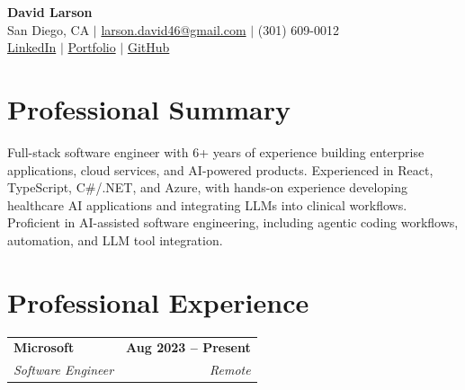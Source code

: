 \documentclass[letterpaper,10pt]{article}
\newcommand{\resumeSubheading}[4]{
    \begin{tabularx}{\textwidth}{X r}
        \textbf{#1} & \textbf{#2} \\
        \textit{\color{muted}#3} & \textit{\color{muted}#4}
    \end{tabularx}
    \vspace{-3pt}
}
\begin{document}
\begin{center}
    {\LARGE \textbf{David Larson}} \\[4pt]
    San Diego, CA \quad $|$ \quad
    \href{mailto:larson.david46@gmail.com}{larson.david46@gmail.com} \quad $|$ \quad
    (301) 609-0012 \\[2pt]
    \href{https://www.linkedin.com/in/larsondavid46}{LinkedIn} \quad $|$ \quad
    \href{https://white-glacier-06b7d7f1e.1.azurestaticapps.net/}{Portfolio} \quad $|$ \quad
    \href{https://github.com/dalarson}{GitHub}
\end{center}

\vspace{-7pt}

\section{Professional Summary}

Full-stack software engineer with 6+ years of experience building
enterprise applications, cloud services, and AI-powered products.
Experienced in React, TypeScript, C\#/.NET, and Azure, with hands-on
experience developing healthcare AI applications and integrating
LLMs into clinical workflows. Proficient in AI-assisted software
engineering, including agentic coding workflows, automation, and
LLM tool integration.

\section{Professional Experience}

\resumeSubheading
    {Microsoft}{Aug 2023 -- Present}
    {Software Engineer}{Remote}
\end{document}

